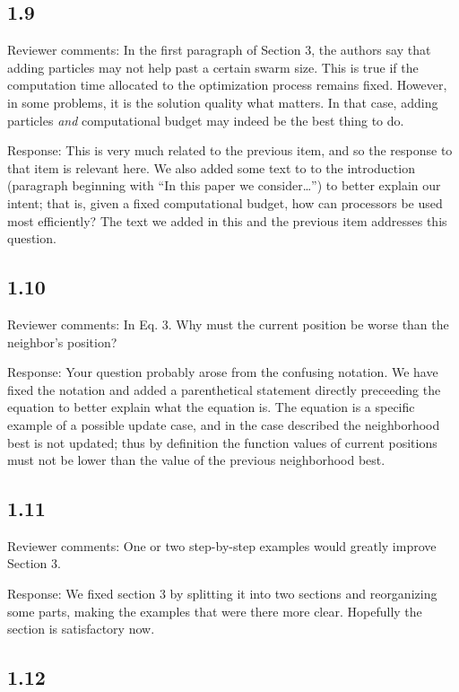 \documentclass[onecolumn, 12pt]{article}
\begin{document}
\subsection*{1.9}

Reviewer comments: In the first paragraph of Section 3, the authors say that
adding particles may not help past a certain swarm size. This is true if the
computation time allocated to the optimization process remains fixed. However,
in some problems, it is the solution quality what matters. In that case, adding
particles \emph{and} computational budget may indeed be the best thing to do.

Response: This is very much related to the previous item, and so the response
to that item is relevant here.  We also added some text to to the introduction
(paragraph beginning with ``In this paper we consider\ldots'') to better
explain our intent; that is, given a fixed computational budget, how can
processors be used most efficiently?  The text we added in this and the
previous item addresses this question.

\subsection*{1.10}

Reviewer comments: In Eq. 3. Why must the current position be worse than the
neighbor's position?

Response: Your question probably arose from the confusing notation.  We have
fixed the notation and added a parenthetical statement directly preceeding the
equation to better explain what the equation is.  The equation is a specific
example of a possible update case, and in the case described the neighborhood
best is not updated; thus by definition the function values of current
positions must not be lower than the value of the previous neighborhood best.

\subsection*{1.11}

Reviewer comments: One or two step-by-step examples would greatly improve
Section 3.

Response: We fixed section 3 by splitting it into two sections and reorganizing
some parts, making the examples that were there more clear.  Hopefully the
section is satisfactory now.

\subsection*{1.12}
\end{document}
